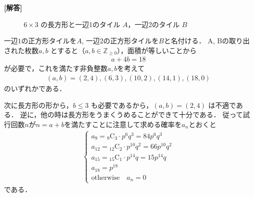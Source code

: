 \documentclass[../../main.tex]{subfiles}
\begin{document}
\begin{oframed}
  
\end{oframed}

{\bf [解答]}
\begin{figure}[htbp]
  \centering
  \caption{$6\times3$ の長方形と一辺1のタイル $A$，一辺2のタイル $B$}
\end{figure}

一辺$1$の正方形タイルを$A$, 一辺$2$の正方形タイルを$B$と名付ける．
A, Bの取り出された枚数$a, b$ とすると（$a, b \in \mathbb{Z}_{\ge 0}$），面積が等しいことから
\begin{align}
  a + 4b = 18 \label{eq:1}
\end{align}
が必要で，これを満たす非負整数$a,b$を考えて
\begin{align}
  (a, b) = (2, 4), (6, 3), (10, 2), (14, 1), (18, 0) \label{eq:2}
\end{align}
のいずれかである．

次に長方形の形から，$b \le 3$ も必要であるから，$(a,b)=(2,4)$ は不適である．
逆に，他の時は長方形をうまくうめることができて十分である．
従って試行回数$n$が$n=a+b$を満たすことに注意して求める確率を$a_n$とおくと
\begin{align}
  \begin{cases}
    a_9    = {}_9\mathrm{C}_3 \cdot p^6 q^3 = 84 p^6 q^3 \\
    a_{12} = {}_{12}\mathrm{C}_2 \cdot p^{10} q^2 = 66 p^{10} q^2 \\
    a_{15} = {}_{15}\mathrm{C}_1 \cdot p^{14} q = 15 p^{14} q \\
    a_{18} = p^{18} \\
    \text{otherwise} \quad a_n = 0
  \end{cases}
\end{align}
である．
\end{document}
